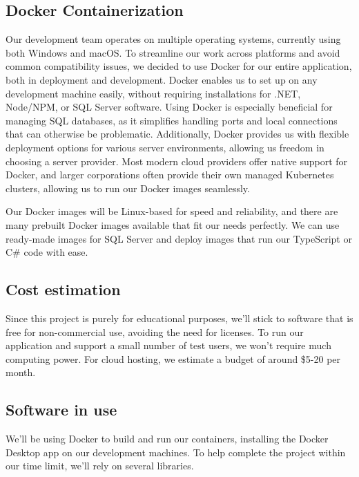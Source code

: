\documentclass[conference]{IEEEtran}
\begin{document}
\subsection {Docker Containerization}
    Our development team operates on multiple operating systems, 
    currently using both Windows and macOS. To streamline our 
    work across platforms and avoid common compatibility issues, 
    we decided to use Docker for our entire application, both in 
    deployment and development. Docker enables us to set up on 
    any development machine easily, without requiring installations 
    for .NET, Node/NPM, or SQL Server software. Using Docker is 
    especially beneficial for managing SQL databases, as it simplifies 
    handling ports and local connections that can otherwise be 
    problematic. Additionally, Docker provides us with flexible 
    deployment options for various server environments, allowing 
    us freedom in choosing a server provider. Most modern cloud 
    providers offer native support for Docker, and larger corporations 
    often provide their own managed Kubernetes clusters, allowing 
    us to run our Docker images seamlessly.

    Our Docker images will be Linux-based for speed and reliability, 
    and there are many prebuilt Docker images available that fit our 
    needs perfectly. We can use ready-made images for SQL Server and 
    deploy images that run our TypeScript or C# code with ease.
    \newline

\subsection {Cost estimation}
    
    Since this project is purely for educational purposes, we’ll stick 
    to software that is free for non-commercial use, avoiding the need 
    for licenses. To run our application and support a small number of 
    test users, we won’t require much computing power. For cloud hosting, 
    we estimate a budget of around \$5-20 per month.

\subsection {Software in use}

    We'll be using Docker to build and run our containers, installing the 
    Docker Desktop app on our development machines. To help complete the 
    project within our time limit, we’ll rely on several libraries.
\end{document}
